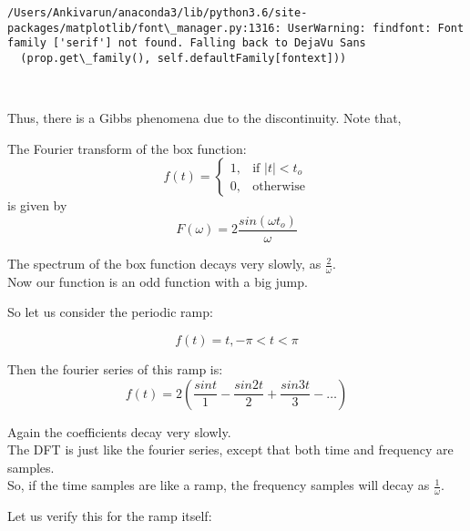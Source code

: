 \documentclass[11pt]{article}
\begin{document}
    \begin{Verbatim}[commandchars=\\\{\}]
/Users/Ankivarun/anaconda3/lib/python3.6/site-packages/matplotlib/font\_manager.py:1316: UserWarning: findfont: Font family ['serif'] not found. Falling back to DejaVu Sans
  (prop.get\_family(), self.defaultFamily[fontext]))

    \end{Verbatim}

    \begin{center}
    \end{center}
    { \hspace*{\fill} \\}
    
    Thus, there is a Gibbs phenomena due to the discontinuity. Note that,

The Fourier transform of the box function: \[f(t) =
\begin{cases}
1,  & \text{if $|t|<t_o$} \\
0, & \text{otherwise}
\end{cases}\] is given by
\[F(\omega) = 2\frac{sin(\omega t_o)}{\omega}\]

The spectrum of the box function decays very slowly, as
\(\frac{2}{\omega}\).\\
Now our function is an odd function with a big jump.

So let us consider the periodic ramp:

\[f (t) = t, −\pi< t < \pi\]

Then the fourier series of this ramp is:
\[f(t)=2(\frac{sin t}{1}-\frac{sin 2t}{2}+\frac{sin 3t}{3} -\dots) \]

Again the coefficients decay very slowly.\\
The DFT is just like the fourier series, except that both time and
frequency are samples.\\
So, if the time samples are like a ramp, the frequency samples will
decay as \(\frac{1}{\omega}\).

Let us verify this for the ramp itself:
\end{document}
